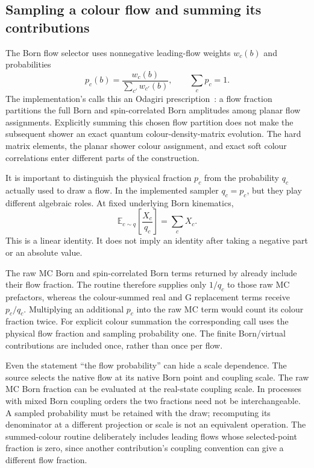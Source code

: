\subsection{Sampling a colour flow and summing its contributions}
\label{sec:source-colourflows}

The Born flow selector uses nonnegative leading-flow weights $w_c(b)$ and
probabilities
\begin{equation}
 p_c(b)=\frac{w_c(b)}{\sum_{c'}w_{c'}(b)},\qquad
 \sum_cp_c=1.
 \label{eq:source-colourprob}
\end{equation}
The implementation's  calls this an Odagiri
prescription~\cite{Odagiri}: a flow fraction partitions the full Born and
spin-correlated Born amplitudes among planar flow assignments. Explicitly
summing this chosen flow partition does not make the subsequent shower an
exact quantum colour-density-matrix evolution. The hard matrix elements,
the planar shower colour assignment, and exact soft colour correlations
enter different parts of the construction.

It is important to distinguish the physical fraction $p_c$ from the
probability $q_c$ actually used to draw a flow. In the implemented sampler
$q_c=p_c$, but they play different algebraic roles. At fixed underlying
Born kinematics,
\begin{equation}
 \mathbb E_{c\sim q}\!\left[\frac{X_c}{q_c}\right]
 =\sum_cX_c.
 \label{eq:source-colourmc}
\end{equation}
This is a linear identity. It does not imply an identity after taking a
negative part or an absolute value.

The raw MC Born and spin-correlated Born terms returned by
 already include their flow fraction. The routine
 therefore supplies only
$1/q_c$ to those raw MC prefactors, whereas the colour-summed real and G
replacement terms receive $p_c/q_c$. Multiplying an additional $p_c$ into
the raw MC term would count its colour fraction twice. For explicit colour
summation the corresponding call uses the physical flow fraction and
sampling probability one. The finite Born/virtual contributions are
included once, rather than once per flow.

Even the statement ``the flow probability'' can hide a scale dependence.
The source selects the native flow at its native Born point and coupling
scale. The raw MC Born fraction can be evaluated at the real-state coupling
scale. In processes with mixed Born coupling orders the two fractions need
not be interchangeable. A sampled probability must be retained with the
draw; recomputing its denominator at a different projection or scale is not
an equivalent operation. The summed-colour routine deliberately includes
leading flows whose selected-point fraction is zero, since another
contribution's coupling convention can give a different flow fraction.

